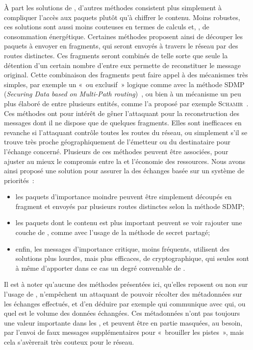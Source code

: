 À part les solutions de , d'autres méthodes consistent plus simplement à compliquer l'accès aux paquets plutôt qu'à chiffrer le contenu.
Moins robustes, ces solutions sont aussi moins couteuses en termes de calculs et, \infine, de consommation énergétique.
Certaines méthodes proposent ainsi de découper les paquets à envoyer en fragments, qui seront envoyés à travers le réseau par des routes distinctes.
Ces fragments seront combinés de telle sorte que seule la détention d'un certain nombre d'entre eux permette de reconstituer le message original.
Cette combinaison des fragments peut faire appel à des mécanismes très simples, par exemple un « ou exclusif » logique comme avec la méthode SDMP (\textit{Securing Data based on Multi-Path routing})~\cite{BM10}, ou bien à un mécanisme un peu plus élaboré de  entre plusieurs entités, comme l'a proposé par exemple \textsc{Schamir}~\cite{Sha79}.
Ces méthodes ont pour intérêt de gêner l'attaquant pour la reconstruction des messages dont il ne dispose que de quelques fragments.
Elles sont inefficaces en revanche si l'attaquant contrôle toutes les routes du réseau, ou simplement s'il se trouve très proche géographiquement de l'émetteur ou du destinataire pour l'échange concerné.
Plusieurs de ces méthodes peuvent être associées, pour ajuster au mieux le compromis entre la \secu et l'économie des ressources.
Nous avons ainsi proposé une solution pour assurer la  des échanges basée sur un système de priorités~\cite{MMB13}:
\begin{itemize}
    \item les paquets d'importance moindre peuvent être simplement découpés en fragment et envoyés par plusieurs routes distinctes selon la méthode SDMP;
    \item les paquets dont le contenu est plus important peuvent se voir rajouter une couche de \secu, comme avec l'usage de la méthode de secret partagé;
    \item enfin, les messages d'importance critique, moins fréquents, utilisent des solutions plus lourdes, mais plus efficaces, de  cryptographique, qui seules sont à même d'apporter dans ce cas un degré convenable de \secu.
\end{itemize}

Il est à noter qu'aucune des méthodes présentées ici, qu'elles reposent ou non sur l'usage de , n'empêchent un attaquant de pouvoir récolter des métadonnées sur les échanges effectués, et d'en déduire par exemple qui communique avec qui, ou quel est le volume des données échangées.
Ces métadonnées n'ont pas toujours une valeur importante dans les \rcs, et peuvent être en partie masquées, au besoin, par l'envoi de faux messages supplémentaires pour « brouiller les pistes », mais cela s'avèrerait très couteux pour le réseau.

